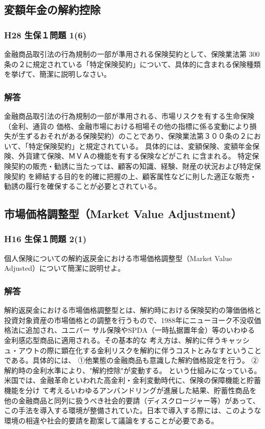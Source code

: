 \documentclass[report,gutter=10mm,fore-edge=10mm,uplatex,dvipdfmx]{jlreq}
\begin{document}
\subsection{変額年金の解約控除}
\subsubsection{H28 生保１問題 1(6)}
金融商品取引法の行為規制の一部が準用される保険契約として、保険業法第 300 条の２に規定されている「特定保険契約」について、具体的に含まれる保険種類を挙げて、簡潔に説明しなさい。

\subsubsection{解答}

金融商品取引法の行為規制の一部が準用される、市場リスクを有する生命保険（金利、通貨の
価格、金融市場における相場その他の指標に係る変動により損失が生ずるおそれがある保険契約）のことであり、保険業法第３００条の２において、「特定保険契約」と規定されている。
具体的には、変額保険、変額年金保険、外貨建て保険、ＭＶＡの機能を有する保険などがこれ
に含まれる。
特定保険契約の販売・勧誘に当たっては、顧客の知識、経験、財産の状況および特定保険契約
を締結する目的を的確に把握の上、顧客属性などに則した適正な販売・勧誘の履行を確保することが必要とされている。

\subsection{市場価格調整型（Market Value Adjustment）}
\subsubsection{H16 生保１問題 2(1)}

個人保険についての解約返戻金における市場価格調整型（Market Value Adjusted）について簡潔に説明せよ。
\subsubsection{解答}


解約返戻金における市場価格調整型とは、解約時における保険契約の簿価価格と投資対象資産の市場価格との調整を行うもので、1988年にニューヨーク不没収価格法に追加され、ユニバー
サル保険やSPDA（一時払据置年金）等のいわゆる金利感応型商品に適用される。その基本的な
考え方は、解約に伴うキャッシュ・アウトの際に顕在化する金利リスクを解約に伴うコストとみなすということである。具体的には、
①他業態の金融商品も意識した解約価格設定を行う。
②解約時の金利水準により、"解約控除"が変動する。
という仕組みになっている。
米国では、金融革命といわれた高金利・金利変動時代に、保険の保障機能と貯蓄機能を分け
て考えるいわゆるアンバンドリングが進展した結果、貯蓄性商品を他の金融商品と同列に扱うべき社会的要請（ディスクロージャー等）があって、この手法を導入する環境が整備されていた。日本で導入する際には、このような環境の相違や社会的要請を勘案して議論をすることが必要である。
\end{document}
